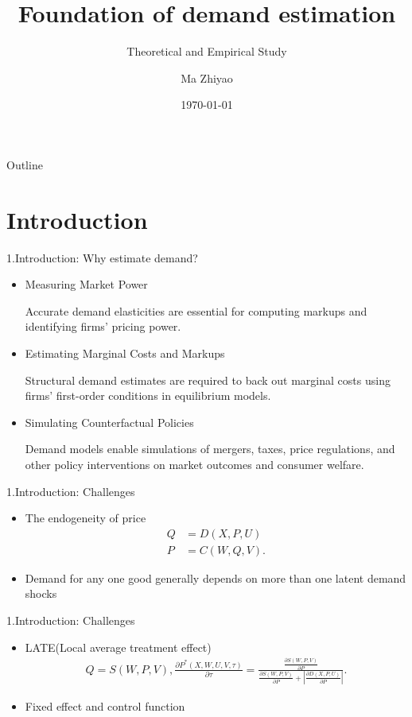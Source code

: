 \documentclass[aspectratio=169]{beamer}  %
\title{Foundation of demand estimation}
\subtitle{Theoretical and Empirical Study}
\author{Ma Zhiyao}
\institute{Hong Kong University of Science and Technology}
\date{\today}
\begin{document}
\begin{frame}
    \titlepage
\end{frame}

\begin{frame}{Outline}
    \tableofcontents
\end{frame}

\section{Introduction}
\begin{frame}{1.Introduction: Why estimate demand?}
    \begin{itemize}
        \item Measuring Market Power

        
        Accurate demand elasticities are essential for computing markups and identifying firms’ pricing power.
        \item Estimating Marginal Costs and Markups


        Structural demand estimates are required to back out marginal costs using firms' first-order conditions in equilibrium models.
        \item Simulating Counterfactual Policies


        Demand models enable simulations of mergers, taxes, price regulations, and other policy interventions on market outcomes and consumer welfare.
    \end{itemize}
\end{frame}

\begin{frame}{1.Introduction: Challenges}
    \begin{itemize}
        \item The endogeneity of price
            \begin{align}
            Q &= D(X, P, U) \tag{1.1} \\
            P &= C(W, Q, V). \tag{1.2}
                \end{align}
        \item Demand for any one good generally depends on more than one latent demand shocks
    \end{itemize}
\end{frame}

\begin{frame}{1.Introduction: Challenges}
    \begin{itemize}
        \item LATE(Local average treatment effect)
            \begin{align}
            Q = S(W, P, V), 
\frac{\partial P^*(X, W, U, V, \tau)}{\partial \tau} =
\frac{ \frac{\partial S(W, P, V)}{\partial P} }
{ \frac{\partial S(W, P, V)}{\partial P} + \left| \frac{\partial D(X, P, U)}{\partial P} \right| }.
\tag{1.3}
    \end{align}
        \item Fixed effect and control function
    \end{itemize}
\end{frame}
\end{document}
